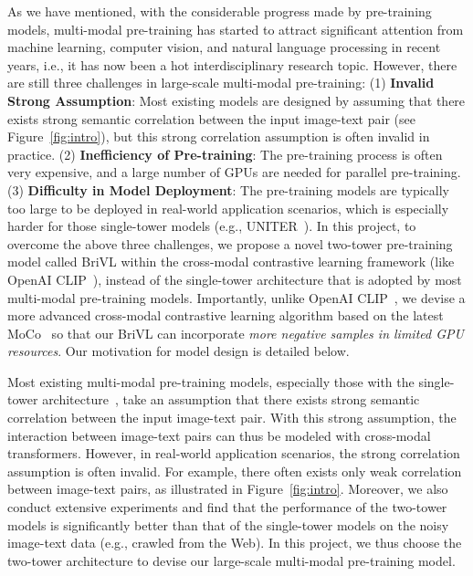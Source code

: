 \documentclass[10pt,twocolumn,letterpaper]{article}
\begin{document}
As we have mentioned, with the considerable progress made by pre-training models, multi-modal pre-training has started to attract significant attention from machine learning, computer vision, and natural language processing in recent years, i.e., it has now been a hot interdisciplinary research topic. However, there are still three challenges in large-scale multi-modal pre-training: (1) \textbf{Invalid Strong Assumption}: Most existing models are designed by assuming that there exists strong semantic correlation between the input image-text pair (see Figure~\ref{fig:intro}), but this strong correlation assumption is often invalid in practice. (2) \textbf{Inefficiency of Pre-training}: The pre-training process is often very expensive, and a large number of GPUs are needed for parallel pre-training. (3) \textbf{Difficulty in Model Deployment}: The pre-training models are typically too large to be deployed in real-world application scenarios, which is especially harder for those single-tower models (e.g., UNITER~\cite{chen2020uniter}). In this project, to overcome the above three challenges, we propose a novel two-tower pre-training model called BriVL within the cross-modal contrastive learning framework (like OpenAI CLIP~\cite{radford2021learning}), instead of the single-tower architecture that is adopted by most multi-modal pre-training models. Importantly, unlike OpenAI CLIP~\cite{radford2021learning}, we devise a more advanced cross-modal contrastive learning algorithm based on the latest MoCo~\cite{he2020momentum} so that our BriVL can incorporate \emph{more negative samples in limited GPU resources}. Our motivation for model design is detailed below. 

Most existing multi-modal pre-training models, especially those with the single-tower architecture~\cite{li2020oscar,uppal2020emerging,qi2020imagebert,xia2020xgpt,desai2020virtex,gan2020large,yu2020ernie,messina2020fine,cho2020x,gu2020self}, take an assumption that there exists strong semantic correlation between the input image-text pair. With this strong assumption, the interaction between image-text pairs can thus be modeled with cross-modal transformers. However, in real-world application scenarios, the strong correlation assumption is often invalid. For example, there often exists only weak correlation between image-text pairs, as illustrated in Figure~\ref{fig:intro}. Moreover, we also conduct extensive experiments and find that the performance of the two-tower models is significantly better than that of the single-tower models on the noisy image-text data (e.g., crawled from the Web). In this project, we thus choose the two-tower architecture to devise our large-scale multi-modal pre-training model.
\end{document}
